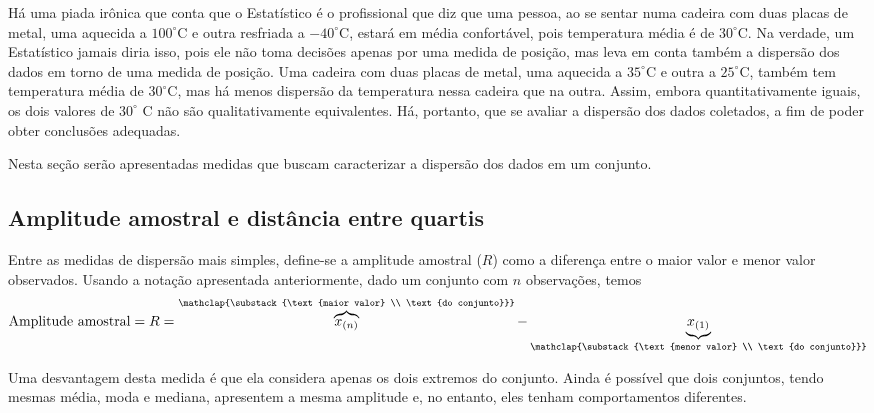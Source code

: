 Há uma piada irônica que conta que o Estatístico é o profissional que diz que uma pessoa, ao se sentar numa cadeira com duas placas de metal, uma aquecida a \(100^{\circ}\)C e outra resfriada a \(-40^{\circ}\)C, estará em média confortável, pois temperatura média é de \(30^{\circ}\)C. Na verdade, um Estatístico jamais diria isso, pois ele não toma decisões apenas por uma medida de posição, mas leva em conta também a dispersão dos dados em torno de uma medida de posição. Uma cadeira com duas placas de metal, uma aquecida a \(35^{\circ}\)C e outra a \(25^{\circ}\)C, também tem temperatura média de \(30^{\circ}\)C, mas há menos dispersão da temperatura nessa cadeira que na outra. Assim, embora quantitativamente iguais, os dois valores de \(30^{\circ}\) C não são qualitativamente equivalentes. Há, portanto, que se avaliar a dispersão dos dados coletados, a fim de poder obter conclusões adequadas.

Nesta seção serão apresentadas medidas que buscam caracterizar a dispersão dos dados em um conjunto.

\subsection{Amplitude amostral e distância entre quartis}

Entre as medidas de dispersão mais simples, define-se a amplitude amostral ($R$) como a diferença entre o maior valor e menor valor observados. Usando a notação apresentada anteriormente, dado um conjunto com $n$ observações, temos
\begin{equation*}
\begin{split}\text{Amplitude amostral}=R= \overbrace{x_{(n)}}^{\mathclap{\substack{\text{maior valor} \\ \text{do conjunto}}}}-\underbrace{x_{(1)}}_{\mathclap{\substack{\text{menor valor} \\ \text{do conjunto}}}}\end{split}
\end{equation*}

Uma desvantagem desta medida é que ela considera apenas os dois extremos do conjunto. Ainda é possível que dois conjuntos, tendo mesmas média, moda e mediana, apresentem a mesma amplitude e, no entanto, eles tenham comportamentos diferentes.

